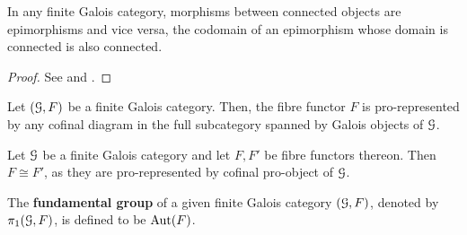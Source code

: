                 \begin{lemma} \label{lemma: morphisms_between_connected_objects_are_epic}
                    In any finite Galois category, morphisms between connected objects are epimorphisms and vice versa, the codomain of an epimorphism whose domain is connected is also connected.
                \end{lemma}
                    \begin{proof}
                        See \cite[\href{https://stacks.math.columbia.edu/tag/0BN0}{Tag 0BN0}]{stacks} and \cite[Proposition 3.5]{nlab:connected_objects}.
                    \end{proof}
                \begin{proposition} \label{prop: fibre_functors_of_finite_galois_categories_are_pro_represented_by_galois_objects}
                    \cite[\href{https://stacks.math.columbia.edu/tag/0BN3}{Tag 0BN3}]{stacks} Let $(\mathcal{G}, F)$ be a finite Galois category. Then, the fibre functor $F$ is pro-represented by any cofinal diagram in the full subcategory spanned by Galois objects of $\mathcal{G}$.
                \end{proposition}
                \begin{corollary} \label{coro: only_one_fibre_functor_on_a_finite_galois_category}
                    Let $\mathcal{G}$ be a finite Galois category and let $F, F'$ be fibre functors thereon. Then $F \cong F'$, as they are pro-represented by cofinal pro-object of $\mathcal{G}$.
                \end{corollary}
                
                \begin{definition} \label{def: fundamental_groups_of_finite_galois_categories}
                    The \textbf{fundamental group} of a given finite Galois category $(\mathcal{G}, F)$, denoted by $\pi_1(\mathcal{G}, F)$, is defined to be $\mathrm{Aut}(F)$.
                \end{definition}
                
